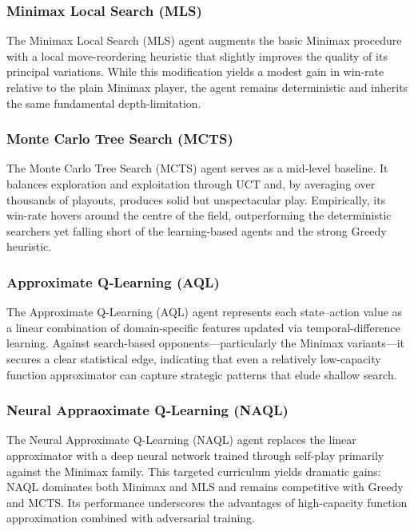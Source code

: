 \subsubsection{Minimax Local Search (MLS)}
The Minimax Local Search (MLS) agent augments the basic Minimax procedure with a local move-reordering heuristic that slightly improves the quality of its principal variations. While this modification yields a modest gain in win-rate relative to the plain Minimax player, the agent remains deterministic and inherits the same fundamental depth-limitation.

\subsubsection{Monte Carlo Tree Search (MCTS)}
The Monte Carlo Tree Search (MCTS) agent serves as a mid-level baseline. It balances exploration and exploitation through UCT and, by averaging over thousands of playouts, produces solid but unspectacular play. Empirically, its win-rate hovers around the centre of the field, outperforming the deterministic searchers yet falling short of the learning-based agents and the strong Greedy heuristic.

\subsubsection{Approximate Q‑Learning (AQL)}
The Approximate Q-Learning (AQL) agent represents each state–action value as a linear combination of domain-specific features updated via temporal-difference learning. Against search-based opponents—particularly the Minimax variants—it secures a clear statistical edge, indicating that even a relatively low-capacity function approximator can capture strategic patterns that elude shallow search.

\subsubsection{Neural Appraoximate Q‑Learning (NAQL)}
The Neural Approximate Q-Learning (NAQL) agent replaces the linear approximator with a deep neural network trained through self-play primarily against the Minimax family. This targeted curriculum yields dramatic gains: NAQL dominates both Minimax and MLS and remains competitive with Greedy and MCTS. Its performance underscores the advantages of high-capacity function approximation combined with adversarial training.

